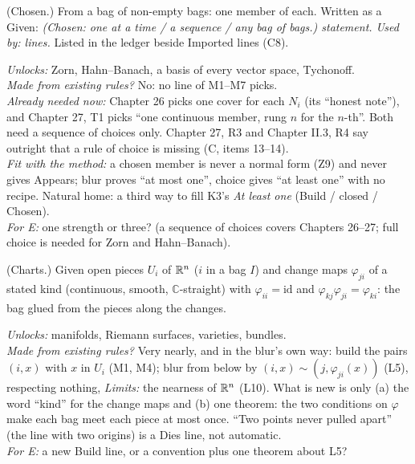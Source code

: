\begin{lines}
\item[\lab{X1}] (Chosen.) From a bag of non-empty bags: one member of each. Written as a Given: \emph{(Chosen: one at a time / a sequence / any bag of bags.) statement. Used by: lines.} Listed in the ledger beside Imported lines (C8).
\end{lines}
\emph{Unlocks:} Zorn, Hahn--Banach, a basis of every vector space, Tychonoff. \\
\emph{Made from existing rules?} No: no line of M1--M7 picks. \\
\emph{Already needed now:} Chapter 26 picks one cover for each $N_i$ (its ``honest note''), and Chapter 27, T1 picks ``one continuous member, rung $n$ for the $n$-th''. Both need a sequence of choices only. Chapter 27, R3 and Chapter II.3, R4 say outright that a rule of choice is missing (C, items 13--14). \\
\emph{Fit with the method:} a chosen member is never a normal form (Z9) and never gives Appears; blur proves ``at most one'', choice gives ``at least one'' with no recipe. Natural home: a third way to fill K3's \emph{At least one} (Build / closed / Chosen). \\
\emph{For E:} one strength or three? (a sequence of choices covers Chapters 26--27; full choice is needed for Zorn and Hahn--Banach).

\begin{lines}
\item[\lab{X2}] (Charts.) Given open pieces $U_i$ of $\mathbb{R}^n$ ($i$ in a bag $I$) and change maps $\varphi_{ji}$ of a stated kind (continuous, smooth, $\mathbb{C}$-straight) with $\varphi_{ii} = \mathrm{id}$ and $\varphi_{kj}\varphi_{ji} = \varphi_{ki}$: the bag glued from the pieces along the changes.
\end{lines}
\emph{Unlocks:} manifolds, Riemann surfaces, varieties, bundles. \\
\emph{Made from existing rules?} Very nearly, and in the blur's own way: build the pairs $(i, x)$ with $x$ in $U_i$ (M1, M4); blur from below by $(i, x) \sim (j, \varphi_{ji}(x))$ (L5), respecting nothing, \emph{Limits:} the nearness of $\mathbb{R}^n$ (L10). What is new is only (a) the word ``kind'' for the change maps and (b) one theorem: the two conditions on $\varphi$ make each bag meet each piece at most once. ``Two points never pulled apart'' (the line with two origins) is a Dies line, not automatic. \\
\emph{For E:} a new Build line, or a convention plus one theorem about L5?

